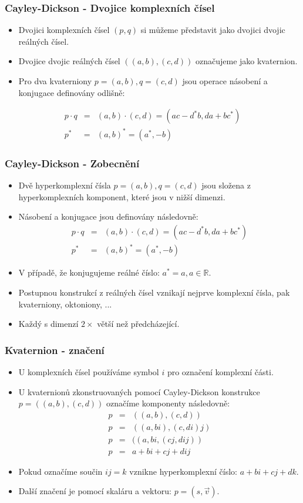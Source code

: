 \begin{frame}
\frametitle{Cayley-Dickson - Dvojice komplexních čísel}
	\begin{itemize}
	\item Dvojici komplexních čísel $(p,q)$ si můžeme představit jako dvojici dvojic reálných čísel.
	\item Dvojice dvojic reálných čísel $((a,b),(c,d))$ označujeme jako kvaternion.
	\item Pro dva kvaterniony $p=(a,b),q=(c,d)$ jsou operace násobení a konjugace definovány odlišně:
	\end{itemize} 
\begin{eqnarray*}
p\cdot q &=& (a,b) \cdot (c,d) = (ac-d^*b,da+bc^*)\\
p^*&=&(a,b)^*=(a^*,-b)
\end{eqnarray*}
\end{frame}

\begin{frame}
\frametitle{Cayley-Dickson - Zobecnění}
	\begin{itemize}
	\item Dvě hyperkomplexní čísla $p=(a,b),q=(c,d)$ jsou složena z hyperkomplexních komponent, které jsou v nižší dimenzi.
	\item Násobení a konjugace jsou definovány následovně:
\begin{eqnarray*}
p\cdot q &=& (a,b) \cdot (c,d) = (ac-d^*b,da+bc^*)\\
p^*&=&(a,b)^*=(a^*,-b)
\end{eqnarray*}
 \item V případě, že konjugujeme reálné číslo: $a^*=a, a \in \mathbb{R}.$
 \item Postupnou konstrukcí z reálných čísel vznikají nejprve komplexní čísla, pak kvaterniony, oktoniony, ...
 \item Každý s dimenzí $2\times$ větší než předcházející.
\end{itemize} 
\end{frame}

\begin{frame}
\frametitle{Kvaternion - značení}
\begin{itemize}
\item U komplexních čísel používáme symbol $i$ pro označení komplexní části.
\item U kvaternionů zkonstruovaných pomocí Cayley-Dickson konstrukce $p=((a,b),(c,d))$ označíme komponenty následovně:
\begin{eqnarray*}
p &=& ((a,b),(c,d))\\
p &=& ((a,bi),(c,di)j)\\
p &=& ((a,bi,(cj,dij))\\
p &=& a+bi+cj+dij
\end{eqnarray*}
\item Pokud označíme součin $ij=k$ vznikne hyperkomplexní číslo: $a+bi+cj+dk$.
\item Další značení je pomocí skaláru a vektoru: $p=(s,\vec v)$.
\end{itemize}
\end{frame}

